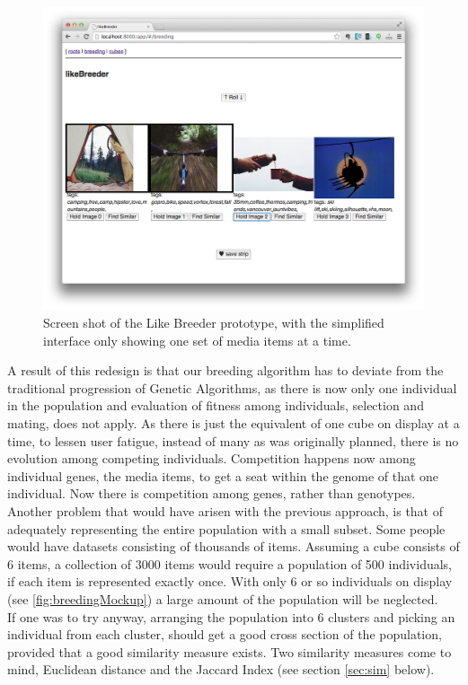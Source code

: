 \documentclass[conference]{IEEETran}
\begin{document}
\begin{figure}[htp]
	\centerline{\includegraphics[width=\columnwidth]{breederPrototype2.png}}
	\caption{Screen shot of the Like Breeder prototype, with the simplified interface only showing one set of media items at a time.}
	\label{fig:likeBreeder}
\end{figure}

A result of this redesign is that our breeding algorithm has to deviate from the traditional progression of Genetic Algorithms, as there is now only one individual in the population and evaluation of fitness among individuals, selection and mating, does not apply.  As there is just the equivalent of one cube on display at a time, to lessen user fatigue, instead of many as was originally planned, there is no evolution among competing individuals.  Competition happens now among individual genes, the media items, to get a seat within the genome of that one individual.  Now there is competition among genes, rather than genotypes.\\

Another problem that would have arisen with the previous approach, is that of adequately representing the entire population with a small subset. Some people would have datasets consisting of thousands of items. Assuming a cube consists of 6 items, a collection of 3000 items would require a population of 500 individuals, if each item is represented exactly once. With only 6 or so individuals on display (see \autoref{fig:breedingMockup}) a large amount of the population will be neglected.\\
If one was to try anyway, arranging the population into 6 clusters and picking an individual from each cluster, should get a good cross section of the population, provided that a good similarity measure exists. Two similarity measures come to mind, Euclidean distance and the Jaccard Index (see section \ref{sec:sim} below).
\end{document}
